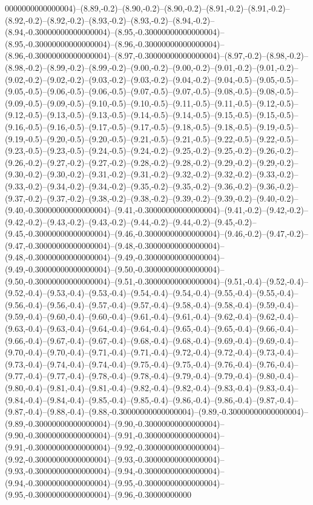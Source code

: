 0000000000000004)--(8.89,-0.2)--(8.90,-0.2)--(8.90,-0.2)--(8.91,-0.2)--(8.91,-0.2)--(8.92,-0.2)--(8.92,-0.2)--(8.93,-0.2)--(8.93,-0.2)--(8.94,-0.2)--(8.94,-0.30000000000000004)--(8.95,-0.30000000000000004)--(8.95,-0.30000000000000004)--(8.96,-0.30000000000000004)--(8.96,-0.30000000000000004)--(8.97,-0.30000000000000004)--(8.97,-0.2)--(8.98,-0.2)--(8.98,-0.2)--(8.99,-0.2)--(8.99,-0.2)--(9.00,-0.2)--(9.00,-0.2)--(9.01,-0.2)--(9.01,-0.2)--(9.02,-0.2)--(9.02,-0.2)--(9.03,-0.2)--(9.03,-0.2)--(9.04,-0.2)--(9.04,-0.5)--(9.05,-0.5)--(9.05,-0.5)--(9.06,-0.5)--(9.06,-0.5)--(9.07,-0.5)--(9.07,-0.5)--(9.08,-0.5)--(9.08,-0.5)--(9.09,-0.5)--(9.09,-0.5)--(9.10,-0.5)--(9.10,-0.5)--(9.11,-0.5)--(9.11,-0.5)--(9.12,-0.5)--(9.12,-0.5)--(9.13,-0.5)--(9.13,-0.5)--(9.14,-0.5)--(9.14,-0.5)--(9.15,-0.5)--(9.15,-0.5)--(9.16,-0.5)--(9.16,-0.5)--(9.17,-0.5)--(9.17,-0.5)--(9.18,-0.5)--(9.18,-0.5)--(9.19,-0.5)--(9.19,-0.5)--(9.20,-0.5)--(9.20,-0.5)--(9.21,-0.5)--(9.21,-0.5)--(9.22,-0.5)--(9.22,-0.5)--(9.23,-0.5)--(9.23,-0.5)--(9.24,-0.5)--(9.24,-0.2)--(9.25,-0.2)--(9.25,-0.2)--(9.26,-0.2)--(9.26,-0.2)--(9.27,-0.2)--(9.27,-0.2)--(9.28,-0.2)--(9.28,-0.2)--(9.29,-0.2)--(9.29,-0.2)--(9.30,-0.2)--(9.30,-0.2)--(9.31,-0.2)--(9.31,-0.2)--(9.32,-0.2)--(9.32,-0.2)--(9.33,-0.2)--(9.33,-0.2)--(9.34,-0.2)--(9.34,-0.2)--(9.35,-0.2)--(9.35,-0.2)--(9.36,-0.2)--(9.36,-0.2)--(9.37,-0.2)--(9.37,-0.2)--(9.38,-0.2)--(9.38,-0.2)--(9.39,-0.2)--(9.39,-0.2)--(9.40,-0.2)--(9.40,-0.30000000000000004)--(9.41,-0.30000000000000004)--(9.41,-0.2)--(9.42,-0.2)--(9.42,-0.2)--(9.43,-0.2)--(9.43,-0.2)--(9.44,-0.2)--(9.44,-0.2)--(9.45,-0.2)--(9.45,-0.30000000000000004)--(9.46,-0.30000000000000004)--(9.46,-0.2)--(9.47,-0.2)--(9.47,-0.30000000000000004)--(9.48,-0.30000000000000004)--(9.48,-0.30000000000000004)--(9.49,-0.30000000000000004)--(9.49,-0.30000000000000004)--(9.50,-0.30000000000000004)--(9.50,-0.30000000000000004)--(9.51,-0.30000000000000004)--(9.51,-0.4)--(9.52,-0.4)--(9.52,-0.4)--(9.53,-0.4)--(9.53,-0.4)--(9.54,-0.4)--(9.54,-0.4)--(9.55,-0.4)--(9.55,-0.4)--(9.56,-0.4)--(9.56,-0.4)--(9.57,-0.4)--(9.57,-0.4)--(9.58,-0.4)--(9.58,-0.4)--(9.59,-0.4)--(9.59,-0.4)--(9.60,-0.4)--(9.60,-0.4)--(9.61,-0.4)--(9.61,-0.4)--(9.62,-0.4)--(9.62,-0.4)--(9.63,-0.4)--(9.63,-0.4)--(9.64,-0.4)--(9.64,-0.4)--(9.65,-0.4)--(9.65,-0.4)--(9.66,-0.4)--(9.66,-0.4)--(9.67,-0.4)--(9.67,-0.4)--(9.68,-0.4)--(9.68,-0.4)--(9.69,-0.4)--(9.69,-0.4)--(9.70,-0.4)--(9.70,-0.4)--(9.71,-0.4)--(9.71,-0.4)--(9.72,-0.4)--(9.72,-0.4)--(9.73,-0.4)--(9.73,-0.4)--(9.74,-0.4)--(9.74,-0.4)--(9.75,-0.4)--(9.75,-0.4)--(9.76,-0.4)--(9.76,-0.4)--(9.77,-0.4)--(9.77,-0.4)--(9.78,-0.4)--(9.78,-0.4)--(9.79,-0.4)--(9.79,-0.4)--(9.80,-0.4)--(9.80,-0.4)--(9.81,-0.4)--(9.81,-0.4)--(9.82,-0.4)--(9.82,-0.4)--(9.83,-0.4)--(9.83,-0.4)--(9.84,-0.4)--(9.84,-0.4)--(9.85,-0.4)--(9.85,-0.4)--(9.86,-0.4)--(9.86,-0.4)--(9.87,-0.4)--(9.87,-0.4)--(9.88,-0.4)--(9.88,-0.30000000000000004)--(9.89,-0.30000000000000004)--(9.89,-0.30000000000000004)--(9.90,-0.30000000000000004)--(9.90,-0.30000000000000004)--(9.91,-0.30000000000000004)--(9.91,-0.30000000000000004)--(9.92,-0.30000000000000004)--(9.92,-0.30000000000000004)--(9.93,-0.30000000000000004)--(9.93,-0.30000000000000004)--(9.94,-0.30000000000000004)--(9.94,-0.30000000000000004)--(9.95,-0.30000000000000004)--(9.95,-0.30000000000000004)--(9.96,-0.30000000000